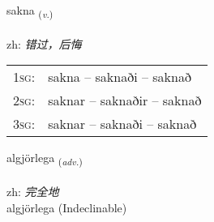 \documentclass[frontgrid, backgrid]{flacards}\usepackage[]{graphicx}\usepackage[]{color}
\begin{document}
\renewcommand{\flhead}{\vskip5pt \fboxsep=0pt {\small\bfseries\footnotesize Sagnorð | 动词}}
\renewcommand{\fcfoot}{\vskip5pt \fboxsep=0pt \hspace{2pt}{\small\bfseries\footnotesize 2K}}

\renewcommand{\blhead}{\vskip5pt {\small\bfseries\footnotesize Sagnorð | 动词 }}
\renewcommand{\bcfoot}{\vskip5pt \hspace{2pt}{\small\bfseries\footnotesize 2K}}


{sakna \small{\textsubscript{(\textit{v.})}} \\[1ex] %
\textphonetic{[sahkna]} \\
zh: \emph{错过，后悔} \\  [2ex]
\renewcommand*{\arraystretch}{0.8}
\begin{tabular}{p{1cm}l}
\textsc{1sg}: & sakna -- saknaði -- saknað \\ 
\textsc{2sg}: & saknar -- saknaðir -- saknað \\ 
\textsc{3sg}: & saknar -- saknaði -- saknað \\ 
\end{tabular}
}


\renewcommand{\flhead}{\vskip5pt \fboxsep=0pt {\small\bfseries\footnotesize Atviksorð | 副词}}
\renewcommand{\fcfoot}{\vskip5pt \fboxsep=0pt \hspace{2pt}{\small\bfseries\footnotesize 2K}}

\renewcommand{\blhead}{\vskip5pt {\small\bfseries\footnotesize Atviksorð | 副词 }}
\renewcommand{\bcfoot}{\vskip5pt \hspace{2pt}{\small\bfseries\footnotesize 2K}}


{algjörlega \small{\textsubscript{(\textit{adv.})}} \\[1ex]
\textphonetic{[alcœrlɛɣa]} \\
zh: \emph{完全地} \\  [2ex]
algjörlega (Indeclinable)}

\renewcommand{\flhead}{\vskip5pt \fboxsep=0pt {\small\bfseries\footnotesize Nafnorð | 名词}}
\renewcommand{\fcfoot}{\vskip5pt \fboxsep=0pt \hspace{2pt}{\small\bfseries\footnotesize 2K}}
\end{document}
